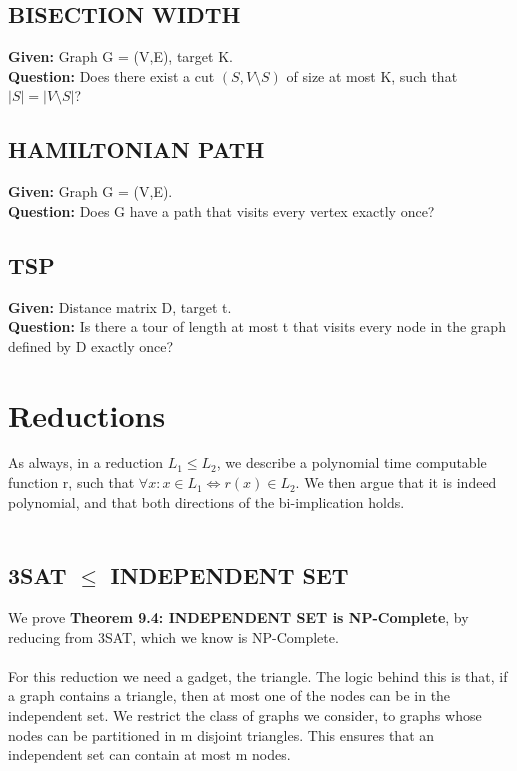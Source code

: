 \documentclass{article}
\begin{document}
\subsection{BISECTION WIDTH}
\textbf{Given:} Graph G = (V,E), target K.\\
\textbf{Question:} Does there exist a cut  $(S,V\setminus S)$ of size at most K, such that $|S| =  |V \setminus S|$?
\subsection{HAMILTONIAN PATH}
\textbf{Given:} Graph G = (V,E).\\
\textbf{Question:} Does G have a path that visits every vertex exactly once?\\
\subsection{TSP}
\textbf{Given:} Distance matrix D, target t. \\
\textbf{Question:} Is there a tour of length at most t that visits every node in the graph defined by D exactly once?\\
\section{Reductions}
As always, in a reduction $L_1 \le L_2$, we describe a polynomial time computable function r, such that $\forall x: x\in L_1 \iff r(x) \in L_2$. We then argue that it is indeed polynomial, and that both directions of the bi-implication holds.\\\\
\subsection{3SAT $\le$ INDEPENDENT SET}
We prove \textbf{Theorem 9.4: INDEPENDENT SET is NP-Complete}, by reducing from 3SAT, which we know is NP-Complete.\\\\
For this reduction we need a gadget, the triangle. The logic behind this is that, if a graph contains a triangle, then at most one of the nodes can be in the independent set. We restrict the class of graphs we consider, to graphs whose nodes can be partitioned in m disjoint triangles. This ensures that an independent set can contain at most m nodes. \\
\end{document}
